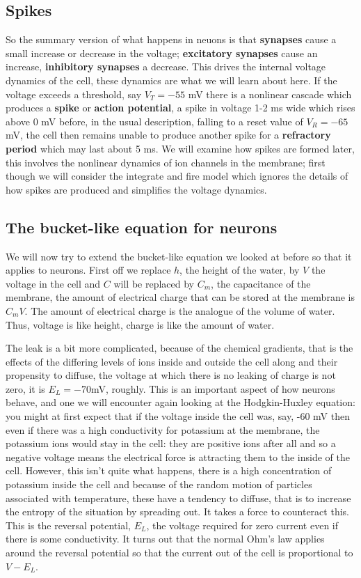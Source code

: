 \documentclass[12pt]{article}
\begin{document}
\subsection*{Spikes}

So the summary version of what happens in neuons is that
\textbf{synapses} cause a small increase or decrease in the voltage;
\textbf{excitatory synapses} cause an increase, \textbf{inhibitory
  synapses} a decrease. This drives the internal voltage dynamics of
the cell, these dynamics are what we will learn about here. If the
voltage exceeds a threshold, say $V_T=-55$ mV there is a nonlinear
cascade which produces a \textbf{spike} or \textbf{action potential},
a spike in voltage 1-2 ms wide which rises above 0 mV before, in the
usual description, falling to a reset value of $V_R=-65$ mV, the cell
then remains unable to produce another spike for a \textbf{refractory
  period} which may last about 5 ms. We will examine how spikes are
formed later, this involves the nonlinear dynamics of ion channels in
the membrane; first though we will consider the integrate and fire
model which ignores the details of how spikes are produced and
simplifies the voltage dynamics.

\subsection*{The bucket-like equation for neurons}

We will now try to extend the bucket-like equation we looked at before
so that it applies to neurons. First off we replace $h$, the height of
the water, by $V$ the voltage in the cell and $C$ will be replaced by
$C_m$, the capacitance of the membrane, the amount of electrical
charge that can be stored at the membrane is $C_mV$. The amount of
electrical charge is the analogue of the volume of water. Thus,
voltage is like height, charge is like the amount of water.

The leak is a bit more complicated, because of the chemical gradients,
that is the effects of the differing levels of ions inside and outside
the cell along and their propensity to diffuse, the voltage at which
there is no leaking of charge is not zero, it is $E_L=-70 $mV,
roughly. This is an important aspect of how neurons behave, and one we
will encounter again looking at the Hodgkin-Huxley equation: you might
at first expect that if the voltage inside the cell was, say, -60 mV
then even if there was a high conductivity for potassium at the
membrane, the potassium ions would stay in the cell: they are positive
ions after all and so a negative voltage means the electrical force is
attracting them to the inside of the cell. However, this isn't quite
what happens, there is a high concentration of potassium inside the
cell and because of the random motion of particles associated with
temperature, these have a tendency to diffuse, that is to increase the
entropy of the situation by spreading out. It takes a force to
counteract this. This is the reversal potential, $E_L$, the voltage
required for zero current even if there is some conductivity. It turns
out that the normal Ohm's law applies around the reversal potential so
that the current out of the cell is proportional to $V-E_L$.
\end{document}
